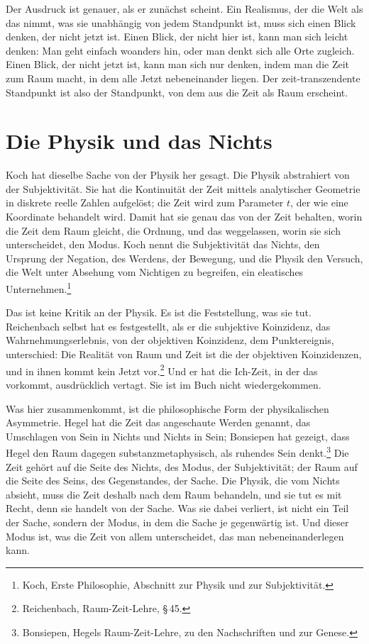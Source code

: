 Der Ausdruck  ist genauer, als er zunächst scheint. Ein Realismus, der die Welt als das nimmt, was sie unabhängig von jedem Standpunkt ist, muss sich einen Blick denken, der nicht jetzt ist. Einen Blick, der nicht hier ist, kann man sich leicht denken: Man geht einfach woanders hin, oder man denkt sich alle Orte zugleich. Einen Blick, der nicht jetzt ist, kann man sich nur denken, indem man die Zeit zum Raum macht, in dem alle Jetzt nebeneinander liegen. Der zeit-transzendente Standpunkt ist also der Standpunkt, von dem aus die Zeit als Raum erscheint.

\section{Die Physik und das Nichts}

Koch hat dieselbe Sache von der Physik her gesagt. Die Physik abstrahiert von der Subjektivität. Sie hat die Kontinuität der Zeit mittels analytischer Geometrie in diskrete reelle Zahlen aufgelöst; die Zeit wird zum Parameter $t$, der wie eine Koordinate behandelt wird. Damit hat sie genau das von der Zeit behalten, worin die Zeit dem Raum gleicht, die Ordnung, und das weggelassen, worin sie sich unterscheidet, den Modus. Koch nennt die Subjektivität das Nichts, den Ursprung der Negation, des Werdens, der Bewegung, und die Physik den Versuch, die Welt unter Absehung vom Nichtigen zu begreifen, ein eleatisches Unternehmen.\footnote{Koch, Erste Philosophie, Abschnitt zur Physik und zur Subjektivität.}

Das ist keine Kritik an der Physik. Es ist die Feststellung, was sie tut. Reichenbach selbst hat es festgestellt, als er die subjektive Koinzidenz, das Wahrnehmungserlebnis, von der objektiven Koinzidenz, dem Punktereignis, unterschied: Die Realität von Raum und Zeit ist die der objektiven Koinzidenzen, und in ihnen kommt kein Jetzt vor.\footnote{Reichenbach, Raum-Zeit-Lehre, \S\,45.} Und er hat die Ich-Zeit, in der das  vorkommt, ausdrücklich vertagt. Sie ist im Buch nicht wiedergekommen.

Was hier zusammenkommt, ist die philosophische Form der physikalischen Asymmetrie. Hegel hat die Zeit das angeschaute Werden genannt, das Umschlagen von Sein in Nichts und Nichts in Sein; Bonsiepen hat gezeigt, dass Hegel den Raum dagegen substanzmetaphysisch, als ruhendes Sein denkt.\footnote{Bonsiepen, Hegels Raum-Zeit-Lehre, zu den Nachschriften und zur Genese.} Die Zeit gehört auf die Seite des Nichts, des Modus, der Subjektivität; der Raum auf die Seite des Seins, des Gegenstandes, der Sache. Die Physik, die vom Nichts absieht, muss die Zeit deshalb nach dem Raum behandeln, und sie tut es mit Recht, denn sie handelt von der Sache. Was sie dabei verliert, ist nicht ein Teil der Sache, sondern der Modus, in dem die Sache je gegenwärtig ist. Und dieser Modus ist, was die Zeit von allem unterscheidet, das man nebeneinanderlegen kann.
